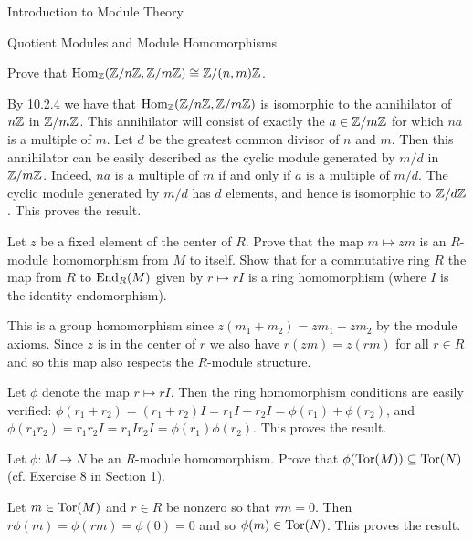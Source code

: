 \begin{chapter}{Introduction to Module Theory}
\begin{section}{Quotient Modules and Module Homomorphisms}
\begin{problem}\label{ex:10.2.6}
Prove that $\operatorname{Hom}_{\mathbb{Z}}(\mathbb{Z}/n\mathbb{Z}, \mathbb{Z}/m\mathbb{Z}) \cong \mathbb{Z}/(n,m)\mathbb{Z}$.
\end{problem}
\begin{solution}
By 10.2.4 we have that $\operatorname{Hom}_{\mathbb{Z}}(\mathbb{Z}/n\mathbb{Z}, \mathbb{Z}/m\mathbb{Z})$ is isomorphic to the annihilator of $n\mathbb{Z}$ in $\mathbb{Z}/m\mathbb{Z}$. This annihilator will consist of exactly the $a\in\mathbb{Z}/m\mathbb{Z}$ for which $na$ is a multiple of $m$. Let $d$ be the greatest common divisor of $n$ and $m$. Then this annihilator can be easily described as the cyclic module generated by $m/d$ in $\mathbb{Z}/m\mathbb{Z}$. Indeed, $na$ is a multiple of $m$ if and only if $a$ is a multiple of $m/d$. The cyclic module generated by $m/d$ has $d$ elements, and hence is isomorphic to $\mathbb{Z}/d\mathbb{Z}$. This proves the result.

\end{solution}\oneperpage



\begin{problem}\label{ex:10.2.7}
Let $z$ be a fixed element of the center of $R$. Prove that the map $m\mapsto zm$ is an $R$-module homomorphism from $M$ to itself. Show that for a commutative ring $R$ the map from $R$ to $\operatorname{End}_R(M)$ given by $r\mapsto rI$ is a ring homomorphism (where $I$ is the identity endomorphism).
\end{problem}
\begin{solution}
This is a group homomorphism since $z(m_1+m_2) = zm_1 + zm_2$ by the module axioms. Since $z$ is in the center of $r$ we also have $r(zm) = z(rm)$ for all $r\in R$ and so this map also respects the $R$-module structure. 

Let $\phi$ denote the map $r\mapsto rI$. Then the ring homomorphism conditions are easily verified: $\phi(r_1+r_2) = (r_1+r_2)I = r_1I+r_2I = \phi(r_1) + \phi(r_2)$, and $\phi(r_1r_2) = r_1r_2I = r_1I r_2I = \phi(r_1)\phi(r_2)$. This proves the result.
\end{solution}\oneperpage



\begin{problem}\label{ex:10.2.8}
Let $\phi:M\to N$ be an $R$-module homomorphism. Prove that $\phi(\operatorname{Tor}(M)) \subseteq \operatorname{Tor}(N)$ (cf. Exercise 8 in Section 1). 
\end{problem}
\begin{solution}
Let $m\in \operatorname{Tor}(M)$ and $r\in R$ be nonzero so that $rm=0$. Then $r\phi(m) = \phi(rm) = \phi(0) = 0$ and so $\phi(m)\in \operatorname{Tor}(N)$. This proves the result.
\end{solution}\oneperpage




\end{section}
\end{chapter}
